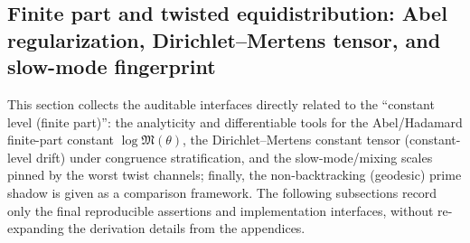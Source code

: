 \subsection{Finite part and twisted equidistribution: Abel regularization, Dirichlet--Mertens tensor, and slow-mode fingerprint}\label{subsec:zeta-finite-part-finite-constant}
This section collects the auditable interfaces directly related to the ``constant level (finite part)'': the analyticity and differentiable tools for the Abel/Hadamard finite-part constant \(\log\mathfrak{M}(\theta)\), the Dirichlet--Mertens constant tensor (constant-level drift) under congruence stratification, and the slow-mode/mixing scales pinned by the worst twist channels; finally, the non-backtracking (geodesic) prime shadow is given as a comparison framework. The following subsections record only the final reproducible assertions and implementation interfaces, without re-expanding the derivation details from the appendices.






















